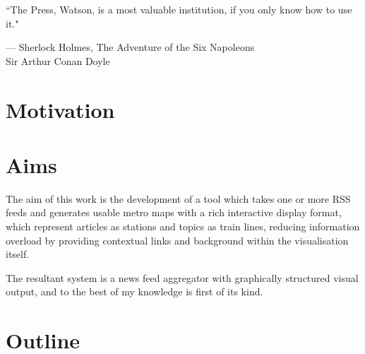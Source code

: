\epigraph{``The Press, Watson, is a most valuable institution, if you only know how to use it."}{--- \textup{Sherlock Holmes}, The Adventure of the Six Napoleons\\ \textup{Sir Arthur Conan Doyle}}

\section{Motivation}

\section{Aims}
The aim of this work is the development of a tool which takes one or more RSS feeds and generates usable metro maps with a rich interactive display format, which represent articles as stations and topics as train lines, reducing information overload by providing contextual links and background within the visualisation itself.

The resultant system is a news feed aggregator with graphically structured visual output, and to the best of my knowledge is first of its kind.

\section{Outline}
